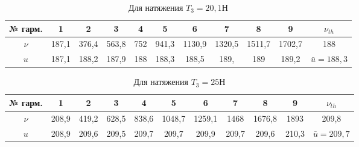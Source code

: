 \documentclass[13pt,a4paper]{article}
\begin{document}
\begin{table}[h!]
\begin{center}
				\begin{tabular}{| c | c | c | c | c | c | c | c | c | c | c |}
					\hline
					№ гарм. & 1 & 2 & 3 & 4 & 5 & 6 & 7 & 8 & 9 & $\nu_{th}$\\ \hline
					$\nu$ & 187,1 & 376,4 & 563,8 & 752 & 941,3 & 1130,9 & 1320,5 & 1511,7 & 1702,7 & 188 \\ \hline
					 $u$ & 187,1 & 188,2 & 187,9 & 188 & 188,3 & 188,5 & 189, & 189 & 189,2 & $\bar{u}=188,3$\\ \hline
				\end{tabular}
				\caption{Для натяжения $T_{3}=20,1$Н}
				\label{tab:mass_of_load_for_all_measuring3}
			\end{center}
\end{table}

\begin{table}[h!]
\begin{center}
				\begin{tabular}{| c | c | c | c | c | c | c | c | c | c | c |}
					\hline
					№ гарм. & 1 & 2 & 3 & 4 & 5 & 6 & 7 & 8 & 9 & $\nu_{th}$\\ \hline
					$\nu$ & 208,9 & 419,2 & 628,5 & 838,6 & 1048,7 & 1259,1 & 1468 & 1676,8 & 1893 & 209,8 \\ \hline
					 $u$ & 208,9 & 209,6 & 209,5 & 209,7 & 209,7 & 209,9 & 209,7 & 209,6 & 210,3 & $\bar{u}=209,7$\\ \hline
				\end{tabular}
				\caption{Для натяжения $T_{3}=25$Н}
				\label{tab:mass_of_load_for_all_measuring4}
			\end{center}
\end{table}
\end{document}
